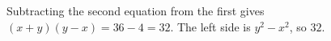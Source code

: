 Subtracting the second equation from the first gives $(x+y)(y-x)=36-4=32$. The left side is $y^2-x^2$, so $\boxed{32}$.
